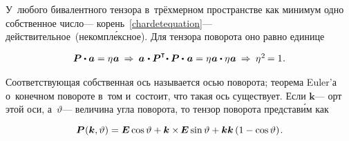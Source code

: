 \begin{otherlanguage}{russian}
У~любого бивалентного тензора в~трёхмерном пространстве как минимум одно собственное число\:--- корень~\eqref{chardetequation}\:--- действительное~(некомпл\'{е}ксное).
Для тензора поворота оно равно единице

\nopagebreak\vspace{-0.1em}\begin{equation*}\begin{array}{c}
\bm{P} \dotp \bm{a} = \eigenvalue \bm{a} \:\Rightarrow\:
\tikzmark{BeginPaBrace} \bm{a} \hspace{0.16ex} \dotp \tikzmark{BeginEBrace} \bm{P}^{\T} \tikzmark{EndPaBrace} \hspace{-0.4ex} \dotp \bm{P} \hspace{-0.32ex}\tikzmark{EndEBrace}\hspace{0.32ex} \dotp \hspace{0.16ex} \bm{a} = \eigenvalue \bm{a} \dotp \eigenvalue \bm{a}
\:\Rightarrow\: \eigenvalue^{2} \hspace{-0.2ex} = 1 \hspace{.1ex} .
\end{array}\end{equation*}

\vspace{-0.5em} \noindent Соответствующая собственная ось называется осью поворота; теорема Euler’а о~конечном повороте в~том и~состоит, что такая ось существует. Если ${\bm{k}}$\:--- орт этой оси, а~${\vartheta}$\:--- величина угла поворота, то тензор поворота представ\'{и}м как

\nopagebreak\vspace{-0.1em}\begin{equation}\label{eulerfiniterotation}
\bm{P}\hspace{0.1ex}(\bm{k},\vartheta) = \bm{E} \operatorname{cos} \vartheta + \bm{k} \times\hspace{-0.2ex} \bm{E} \operatorname{sin} \vartheta + \bm{k} \bm{k} \left({1 - \operatorname{cos} \vartheta}\right) \hspace{-0.2ex} .
\end{equation}


\end{otherlanguage}
